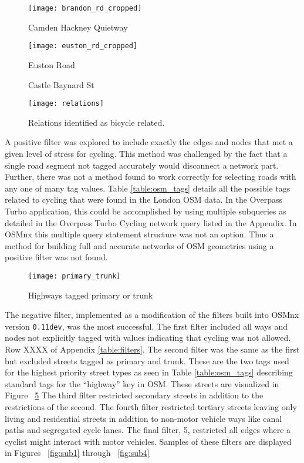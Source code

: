 \begin{figure}
\centering
\texttt{[image: brandon\_rd\_cropped]}
\caption{Camden Hackney Quietway}
\label{fig:brandon}
\end{figure}

\begin{figure}
\centering
\texttt{[image: euston\_rd\_cropped]}
\caption{Euston Road}
\label{fig:euston}
\end{figure}

\begin{figure}
  \centering
  \caption{Castle Baynard St}
  \label{fig:baynard}
\end{figure}

\begin{figure}
\centering
\texttt{[image: relations]}
\caption{Relations identified as bicycle related.}
\label{fig:bicycle_relation}
\end{figure}

A positive filter was explored to include exactly the edges and nodes that met a given level of stress for cycling. This method was challenged by the fact that a single road segment not tagged accurately would disconnect a network part. Further, there was not a method found to work correctly for selecting roads with any one of many tag values.  Table \ref{table:osm_tags} details all the possible tags related to cycling that were found in the London OSM data.  In the Overpass Turbo application, this could be accomplished by using multiple subqueries as detailed in the Overpass Turbo Cycling network query listed in the Appendix. In OSMnx this multiple query statement structure was not an option. Thus a method for building full and accurate networks of OSM geometries using a positive filter was not found. 




\begin{figure}
\centering
\texttt{[image: primary\_trunk]}
\caption{Highways tagged primary or trunk}
\label{fig:primary_trunk}
\end{figure}

The negative filter, implemented as a modification of the filters built into OSMnx version \texttt{0.11dev}, was the most successful. The first filter included all ways and nodes not explicitly tagged with values indicating that cycling was not allowed. Row XXXX of Appendix \ref{table:filters}. The second filter was the same as the first but excluded streets tagged as primary and trunk. These are the two tags used for the highest priority street types as seen in Table \ref{table:osm_tags} describing standard tags for the ``highway'' key in OSM. These streets are visualized in Figure ~\ref{fig:primary_trunk} The third filter restricted secondary streets in addition to the restrictions of the second. The fourth filter restricted tertiary streets leaving only living and residential streets in addition to non-motor vehicle ways like canal paths and segregated cycle lanes. The final filter, 5, restricted all edges where a cyclist might interact with motor vehicles. Samples of these filters are displayed in Figures ~\ref{fig:sub1} through ~\ref{fig:sub4}

